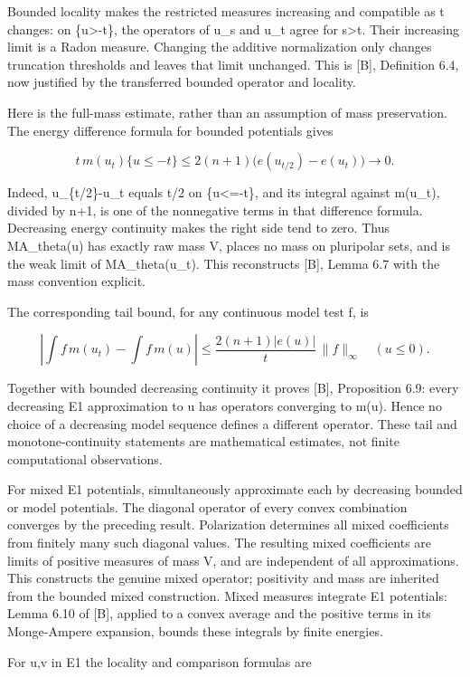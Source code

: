 \documentclass[11pt]{article}
\begin{document}
Bounded locality makes the restricted measures increasing and compatible as t changes: on \{u\textgreater{}-t\}, the operators of u\_s and u\_t agree for s\textgreater{}t. Their increasing limit is a Radon measure. Changing the additive normalization only changes truncation thresholds and leaves that limit unchanged. This is [B], Definition 6.4, now justified by the transferred bounded operator and locality.

Here is the full-mass estimate, rather than an assumption of mass preservation. The energy difference formula for bounded potentials gives

\[
t\,m(u_t)\{u\leq-t\}
\leq2(n+1)\bigl(e(u_{t/2})-e(u_t)\bigr)\longrightarrow0.
\]

Indeed, u\_\{t/2\}-u\_t equals t/2 on \{u\textless{}=-t\}, and its integral against m(u\_t), divided by n+1, is one of the nonnegative terms in that difference formula. Decreasing energy continuity makes the right side tend to zero. Thus MA\_theta(u) has exactly raw mass V, places no mass on pluripolar sets, and is the weak limit of MA\_theta(u\_t). This reconstructs [B], Lemma 6.7 with the mass convention explicit.

The corresponding tail bound, for any continuous model test f, is

\[
\left|\int f\,m(u_t)-\int f\,m(u)\right|
\leq \frac{2(n+1)|e(u)|}{t}\,\|f\|_\infty\quad(u\leq0).
\]

Together with bounded decreasing continuity it proves [B], Proposition 6.9: every decreasing E1 approximation to u has operators converging to m(u). Hence no choice of a decreasing model sequence defines a different operator. These tail and monotone-continuity statements are mathematical estimates, not finite computational observations.

For mixed E1 potentials, simultaneously approximate each by decreasing bounded or model potentials. The diagonal operator of every convex combination converges by the preceding result. Polarization determines all mixed coefficients from finitely many such diagonal values. The resulting mixed coefficients are limits of positive measures of mass V, and are independent of all approximations. This constructs the genuine mixed operator; positivity and mass are inherited from the bounded mixed construction. Mixed measures integrate E1 potentials: Lemma 6.10 of [B], applied to a convex average and the positive terms in its Monge-Ampere expansion, bounds these integrals by finite energies.

For u,v in E1 the locality and comparison formulas are
\end{document}
